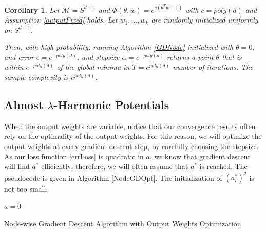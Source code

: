 \documentclass[11pt]{article}
\newtheorem{corollary}[theorem]{Corollary}
\newcommand{\N}{{\mathbb{N}}}
\newcommand{\R}{{\mathbb{R}}}
\begin{document}
\begin{corollary}
Let $\mathcal{M} =  S^{d-1}$ and $\Phi(\theta,w) = e^{c(\theta^Tw-1)}$ with $c = poly(d)$ and Assumption \ref{outputFixed} holds. Let $w_1,...,w_k$ are randomly initialized uniformly on $S^{d-1}$. 

Then, with high probability, running Algorithm \ref{GDNode} initialized with $\theta = 0$, and error  $\epsilon = e^{-poly(d)}$, and stepsize $\alpha = e^{-poly(d)}$ returns a point $\theta$ that is within $e^{-poly(d)}$ of the global minima in $T = e^{poly(d)}$ number of iterations. The sample complexity is $e^{poly(d)}$. 
\end{corollary}

\subsection{Almost $\lambda$-Harmonic Potentials}

When the output weights are variable, notice that our convergence results often rely on the optimality of the output weights. For this reason, we will optimize the output weights at every gradient descent step, by carefully choosing the stepsize. As our loss function \eqref{errLoss} is quadratic in $a$, we know that gradient descent will find $a^*$ efficiently; therefore, we will often assume that $a^*$ is reached. The pseudocode is given in Algorithm \ref{NodeGDOpt}. The initialization of $(a^*_i)^2$ is not too small.



\begin{algorithm}[ht]
\SetAlgoLined
\KwIn{$(a,\theta) = (a_1,...,a_k,\theta_1,...,\theta_k), a_i \in\R, \theta_i\in\mathcal{M}$; $T\in \N$; $\widehat{L}$; $\alpha\in \R$; $\epsilon \in \R$}

 $a = 0$\;
  
 \caption{Node-wise Gradient Descent Algorithm with Output Weights Optimization}
 \label{NodeGDOpt}
\end{algorithm}
\end{document}
